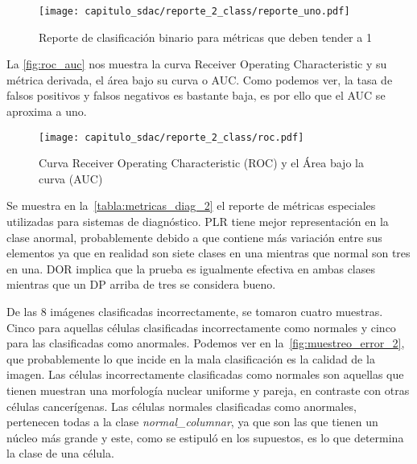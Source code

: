 \begin{figure}[]
    \centering
    \texttt{[image: capitulo\_sdac/reporte\_2\_class/reporte\_uno.pdf]}
    \caption{Reporte de clasificación binario para métricas que deben tender a 1}\label{fig:reporte_2_1}
\end{figure}

La \autoref{fig:roc_auc} nos muestra la curva Receiver Operating Characteristic
y su métrica derivada, el área bajo su curva o AUC. Como podemos ver, la tasa de
falsos positivos y falsos negativos es bastante baja, es por ello que el AUC se
aproxima a uno.

\begin{figure}[H]
    \centering
    \texttt{[image: capitulo\_sdac/reporte\_2\_class/roc.pdf]}
    \caption{Curva Receiver Operating Characteristic (ROC) y el Área bajo la curva (AUC)}\label{fig:roc_auc}
\end{figure}

Se muestra en la~\autoref{tabla:metricas_diag_2} el reporte de métricas
especiales utilizadas para sistemas de diagnóstico. PLR tiene mejor
representación en la clase anormal, probablemente debido a que contiene más
variación entre sus elementos ya que en realidad son siete clases en una
mientras que normal son tres en una. DOR implica que la prueba es igualmente
efectiva en ambas clases mientras que un DP arriba de tres se considera bueno.

\begin{table}[H]
    \centering
    \caption{Métricas para diagnóstico binario}\label{tabla:metricas_diag_2}
    \end{table}

De las 8 imágenes clasificadas incorrectamente, se tomaron cuatro muestras.
Cinco para aquellas células clasificadas incorrectamente como normales y cinco
para las clasificadas como anormales. Podemos ver en
la~\autoref{fig:muestreo_error_2}, que probablemente lo que incide en la mala
clasificación es la calidad de la imagen. Las células incorrectamente
clasificadas como normales son aquellas que tienen muestran una morfología
nuclear uniforme y pareja, en contraste con otras células cancerígenas. Las
células normales clasificadas como anormales, pertenecen todas a la clase
\emph{normal\_columnar}, ya que son las que tienen un núcleo más grande y este,
como se estipuló en los supuestos, es lo que determina la clase de una célula.

